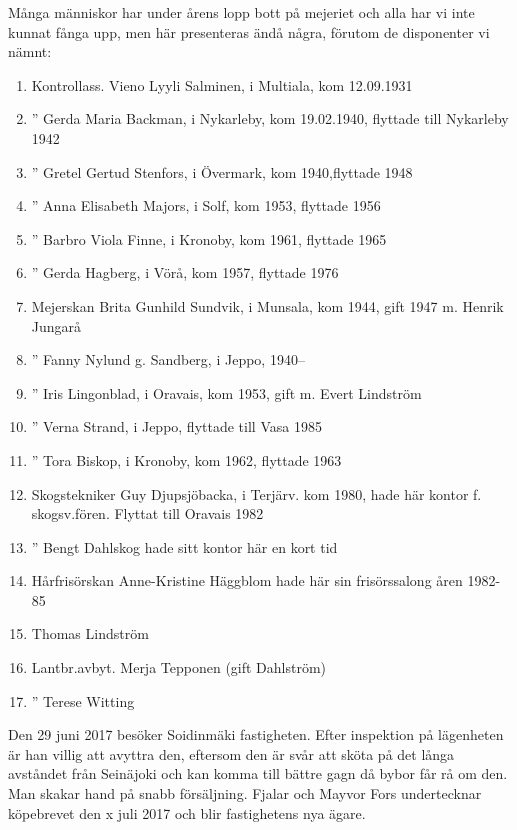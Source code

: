 Många människor har under årens lopp  bott på mejeriet och alla har vi inte kunnat fånga upp, men här presenteras ändå några, förutom de disponenter vi nämnt:
\begin{enumerate}
  \item Kontrollass.  Vieno Lyyli Salminen,  i Multiala, kom 12.09.1931
  \item     ''        Gerda Maria Backman,  i Nykarleby, kom 19.02.1940, flyttade till Nykarleby 1942
  \item     ''        Gretel Gertud Stenfors,  i Övermark, kom 1940,flyttade 1948
  \item     ''        Anna Elisabeth Majors,  i Solf, kom 1953, flyttade 1956
  \item     ''        Barbro Viola Finne,  i Kronoby, kom 1961, flyttade 1965
  \item     ''        Gerda Hagberg,  i Vörå, kom 1957, flyttade 1976
  \item Mejerskan     Brita Gunhild Sundvik,  i Munsala, kom 1944, gift 1947 m. Henrik Jungarå
  \item     ''        Fanny Nylund g. Sandberg,  i Jeppo, 1940--
  \item     ''        Iris Lingonblad,  i Oravais, kom 1953, gift m. Evert Lindström
  \item     ''        Verna Strand,   i Jeppo, flyttade till Vasa 1985
  \item     ''        Tora Biskop,   i  Kronoby, kom 1962, flyttade 1963
  \item Skogstekniker Guy Djupsjöbacka,  i Terjärv. kom 1980, hade här kontor f. skogsv.fören. Flyttat till Oravais 1982
  \item     ''        Bengt Dahlskog hade sitt kontor här en kort tid
  \item Hårfrisörskan Anne-Kristine Häggblom hade här sin frisörssalong åren 1982-85
  \item Thomas Lindström
  \item Lantbr.avbyt. Merja Tepponen (gift Dahlström)
  \item     ''        Terese Witting
\end{enumerate}




Den 29 juni 2017 besöker Soidinmäki fastigheten. Efter inspektion på lägenheten är han villig att avyttra den, eftersom den är svår att sköta på det långa avståndet från Seinäjoki och kan komma till bättre gagn då bybor får rå om den. Man skakar hand på snabb försäljning. Fjalar och Mayvor Fors undertecknar köpebrevet den x juli 2017 och blir fastighetens nya ägare.

